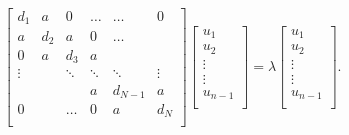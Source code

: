 \documentclass{emulateapj}
\begin{document}
        \begin{equation}\label{eq:eigen_matrix}
            \begin{bmatrix}
               d_{1}& a    & 0    & \ldots  & \ldots  & 0 \\
               a      & d_{2}& a    & 0       & \ldots  &  \\
               0       & a    & d_{3}& a       &   &  \\
               \vdots &  & \ddots & \ddots  & \ddots  & \vdots \\
                      &  &  & a & d_{N-1}& a \\
               0      &  & \ldots & 0 & a & d_{N} \\
            \end{bmatrix}
            \begin{bmatrix}
                u_1\\
                u_2\\
                \vdots \\
                \vdots \\
                u_{n-1}\\
            \end{bmatrix}
            = \lambda
            \begin{bmatrix}
                u_1\\
                u_2\\
                \vdots \\
                \vdots \\
                u_{n-1}\\
            \end{bmatrix}.
        \end{equation}
\end{document}
